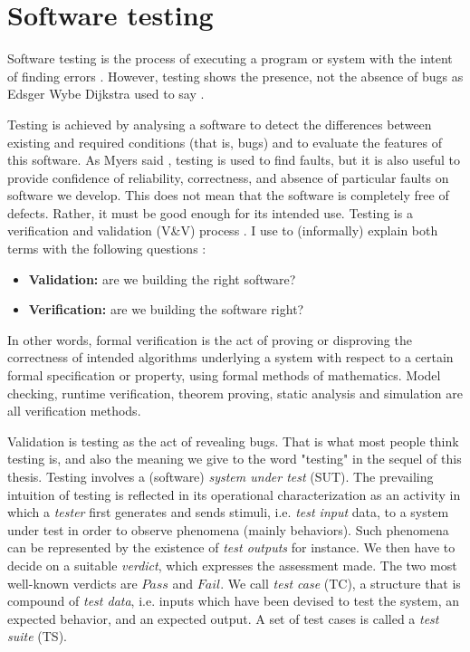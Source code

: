 \section{Software testing}
\label{sec:related:testing}

Software testing is the process of executing a program or system
with the intent of finding errors \cite{Myers:1979:AST:539883}.
However, testing shows the presence, not the absence of bugs as
Edsger Wybe Dijkstra used to say \cite{Buxton:1970:SET:1102021}.

Testing is achieved by analysing a software to detect the
differences between existing and required conditions (that is,
bugs) and to evaluate the features of this software. As Myers
said \cite{Myers:1979:AST:539883}, testing is used to find
faults, but it is also useful to provide confidence of
reliability, correctness, and absence of particular faults on
software we develop. This does not mean that the software is
completely free of defects. Rather, it must be good enough for
its intended use.  Testing is a verification and validation
(V\&V) process \cite{wallace1989software}. I use to (informally)
explain both terms with the following questions \cite{Boehm1979}:

\begin{itemize}
    \item \textbf{Validation:} are we building the right software?
    \item \textbf{Verification:} are we building the software right?
\end{itemize}

In other words, formal verification is the act of proving or
disproving the correctness of intended algorithms underlying a
system with respect to a certain formal specification or
property, using formal methods of mathematics. Model checking,
runtime verification, theorem proving, static analysis and
simulation are all verification methods.

Validation is testing as the act of revealing bugs. That is what
most people think testing is, and also the meaning we give to the
word "testing" in the sequel of this thesis. Testing involves a
(software) \textit{system under test} (SUT). The prevailing
intuition of testing is reflected in its operational
characterization as an activity in which a \textit{tester} first
generates and sends stimuli, i.e. \textit{test input} data, to a
system under test in order to observe phenomena (mainly
behaviors). Such phenomena can be represented by the existence of
\textit{test outputs} for instance. We then have to decide on a
suitable \textit{verdict}, which expresses the assessment made.
The two most well-known verdicts are $Pass$ and $Fail$.
We call \textit{test case} (TC), a structure that is compound of
\textit{test data}, i.e.  inputs which have been devised to test
the system, an expected behavior, and an expected output. A set
of test cases is called a \textit{test suite} (TS).

